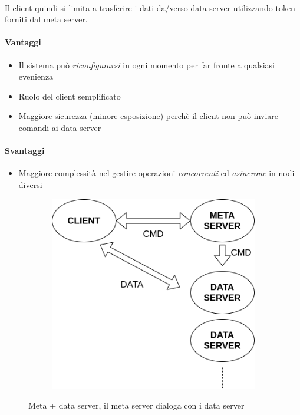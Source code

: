 \documentclass{article}
\begin{document}
\paragraph{} Il client quindi si limita a trasferire i dati da/verso data server utilizzando \underline{token} forniti dal meta server. 

\paragraph{Vantaggi} \begin{itemize}
	\item Il sistema può \emph{riconfigurarsi} in ogni momento per far fronte a qualsiasi evenienza
	\item Ruolo del client semplificato 
	\item Maggiore sicurezza (minore esposizione) perchè il client non può inviare comandi ai data server
\end{itemize}


\paragraph{Svantaggi} \begin{itemize}
	\item Maggiore complessità nel gestire operazioni \emph{concorrenti} ed \emph{asincrone} in nodi diversi
\end{itemize}

\begin{figure}[H]
	\centering
	\begin{subfigure}{0.60\linewidth}
		\includegraphics[width=\linewidth]{../diagrams/architettura/6.png}
	\end{subfigure}
	\caption{Meta + data server, il meta server dialoga con i data server}
\end{figure}
\end{document}
